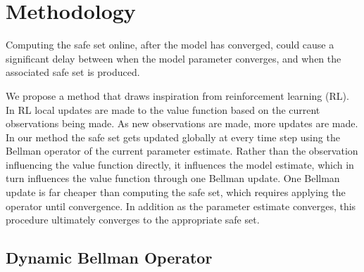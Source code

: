 \documentclass[letterpaper, 10 pt, conference]{ieeeconf}
\begin{document}
\section{Methodology}
Computing the safe set online, after the model has converged, could cause a significant delay between when the model parameter converges, and when the associated safe set is produced. 

We propose a method that draws inspiration from reinforcement learning (RL). In RL local updates are made to the value function based on the current observations being made. As new observations are made, more updates are made. In our method the safe set gets updated globally at every time step using the Bellman operator of the current parameter estimate. Rather than the observation influencing the value function directly, it influences the model estimate, which in turn influences the value function through one Bellman update. One Bellman update is far cheaper than computing the safe set, which requires applying the operator until convergence. In addition as the parameter estimate converges, this procedure ultimately converges to the appropriate safe set.   

\subsection{Dynamic Bellman Operator}

%
%
\end{document}
